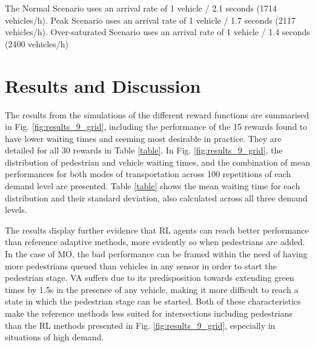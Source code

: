 \documentclass[a4paper, conference]{IEEEtran}
\begin{document}
The Normal Scenario uses an arrival rate of 1 vehicle / 2.1 seconds (1714 vehicles/h). Peak Scenario uses an arrival rate of 1 vehicle / 1.7 seconds (2117 vehicles/h). Over-saturated Scenario uses an arrival rate of 1 vehicle / 1.4 seconds (2400 vehicles/h)


\vspace{-3mm}
\section{Results and Discussion}
\vspace{-1mm}
\label{results}
The results from the simulations of the different reward functions are summarised in Fig. \ref{fig:results_9_grid}, including the performance of the 15 rewards found to have lower waiting times and seeming most desirable in practice. They are detailed for all 30 rewards in Table \ref{table}.
In Fig. \ref{fig:results_9_grid}, the distribution of pedestrian and vehicle waiting times, and the combination of mean performances for both modes of transportation across 100 repetitions of each demand level are presented.
Table \ref{table} shows the mean waiting time for each distribution and their standard deviation, also calculated across all three demand levels. 

The results display further evidence that RL agents can reach better performance than reference adaptive methods, more evidently so when pedestrians are added.
In the case of MO, the bad performance can be framed within the need of having more pedestrians queued than vehicles in any sensor in order to start the pedestrian stage.
VA suffers due to its predisposition towards extending green times by 1.5s in the presence of any vehicle, making it more difficult to reach a state in which the pedestrian stage can be started.
Both of these characteristics make the reference methods less suited for intersections including pedestrians than the RL methods presented in Fig. \ref{fig:results_9_grid}, especially in situations of high demand.
\end{document}
